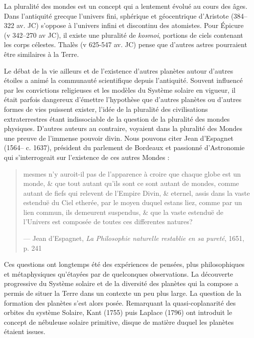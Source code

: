 La pluralité des mondes est un concept qui a lentement évolué au cours des âges. Dans l'antiquité grecque l'univers fini, sphérique et géocentrique d'Aristote (384--322 av. JC) s'oppose à l'univers infini et discontinu des atomistes. Pour Épicure (v 342--270 av JC), il existe une pluralité de \textit{kosmoi}, portions de ciels contenant les corps célestes. Thalès (v 625-547 av. JC) pense que d'autres astres pourraient être similaires à la Terre. 

Le débat de la vie ailleurs et de l'existence d'autres planètes autour d'autres étoiles a animé la communauté scientifique
depuis l'antiquité. Souvent influencé par les convictions religieuses et les modèles du Système solaire en vigueur, il était
parfois dangereux d'émettre l'hypothèse que d'autres planètes ou d'autres formes de vies puissent exister, l'idée de la
pluralité des civilisations extraterrestres étant indissociable de la question de la pluralité des mondes physiques. D'autres auteurs au contraire, voyaient dans la pluralité des Mondes une preuve de l'immense pouvoir divin. Nous pouvons citer Jean d'Espagnet (1564-- c. 1637), président du parlement de Bordeaux et passionné d'Astronomie qui s'interrogeait sur l'existence de ces autres Mondes :
\begin{quote}
\og mesmes n'y auroit-il pas de l'apparence à croire que chaque globe est un monde, \& que tout autant qu'ils sont ce sont
autant de mondes, comme autant de fiefs qui relevent de l'Empire Divin, \& eternel, assis dans la vaste estenduë du Ciel
etherée, par le moyen duquel estans liez, comme par un lien commun, ils demeurent suspendus, \& que la vaste estenduë de
l'Univers est composée de toutes ces differentes natures?\fg 

--- Jean d'Espagnet, \textit{La Philosophie naturelle restablie en sa pureté}, 1651, p. 241 \cite{espagnet1651philosophie}
\end{quote}

Ces questions ont longtemps été des expériences de pensées, plus philosophiques et métaphysiques qu'étayées par de quelconques
observations. La découverte progressive du Système solaire et de la diversité des planètes qui la compose a permis de situer la
Terre dans un contexte un peu plus large. La question de la formation des planètes s'est alors posée. Remarquant la quasi-coplanarité des orbites du système Solaire, Kant (1755) puis Laplace (1796) ont introduit le concept de nébuleuse solaire
primitive, disque de matière duquel les planètes étaient issues. 

